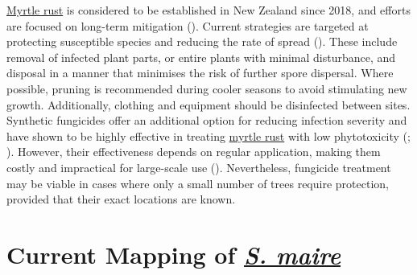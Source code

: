 \documentclass[
]{scrreprt}
\begin{document}
\hyperref[acronyms_MR]{Myrtle rust} is considered to be established in
New Zealand since 2018, and efforts are focused on long-term mitigation
(). Current strategies are targeted at
protecting susceptible species and reducing the rate of spread
(). These
include removal of infected plant parts, or entire plants with minimal
disturbance, and disposal in a manner that minimises the risk of further
spore dispersal. Where possible, pruning is recommended during cooler
seasons to avoid stimulating new growth. Additionally, clothing and
equipment should be disinfected between sites. Synthetic fungicides
offer an additional option for reducing infection severity and have
shown to be highly effective in treating \hyperref[acronyms_MR]{myrtle
rust} with low phytotoxicity
(; ).
However, their effectiveness depends on regular application, making them
costly and impractical for large-scale use
(). Nevertheless, fungicide treatment may be viable in cases
where only a small number of trees require protection, provided that
their exact locations are known.

\section{\texorpdfstring{Current Mapping of
\hyperref[acronyms_SM]{\emph{S.
maire}}}{Current Mapping of S. maire}}\label{current-mapping-of}
\end{document}

